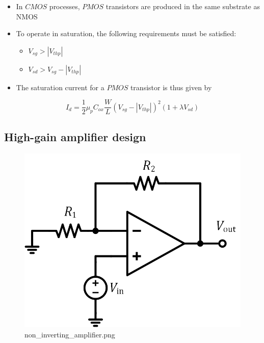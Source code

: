 \documentclass[11pt]{article}
\providecommand{\tightlist}{%
      \setlength{\itemsep}{0pt}\setlength{\parskip}{0pt}}
\begin{document}
    \begin{itemize}
\tightlist
\item
  In \(CMOS\) processes, \(PMOS\) transistors are produced in the same
  substrate as NMOS
\item
  To operate in saturation, the following requirements must be
  satisfied:

  \begin{itemize}
  \tightlist
  \item
    \(V_{sg} > |V_{thp}|\)
  \item
    \(V_{sd} > V_{sg} - |V_{thp}|\)
  \end{itemize}
\item
  The saturation current for a \(PMOS\) transistor is thus given by
\end{itemize}

\begin{equation}
I_d = \dfrac{1}{2}\mu_p C_{ox} \dfrac{W}{L} (V_{sg} - |V_{thp}|)^2(1+\lambda V_{sd})
\end{equation}

    \hypertarget{high-gain-amplifier-design}{%
\subsection{High-gain amplifier
design}\label{high-gain-amplifier-design}}

    \begin{figure}
\centering
\includegraphics{non_inverting_amplifier.png}
\caption{non\_inverting\_amplifier.png}
\end{figure}
\end{document}
